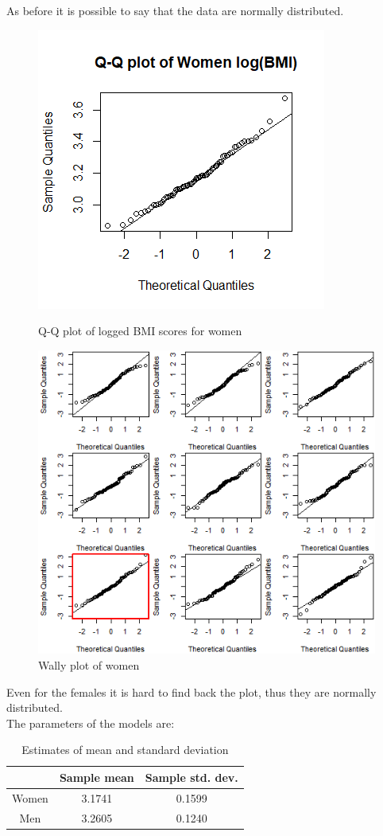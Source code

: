 As before it is possible to say that the data are normally distributed. \\
\begin{figure}[h!]
    \centering
    \includegraphics[scale=0.9]{root/qqwomenlog.png}
    \caption{Q-Q plot of logged BMI scores for women}
    \label{womenqq}
    \includegraphics[scale=0.9]{root/wallywomen.png}
    \caption{Wally plot of women}
    \label{wallywomen}
\end{figure}
Even for the females it is hard to find back the plot, thus they are normally distributed. \\
\newpage
The parameters of the models are:
\begin{table}[h]
\centering
\begin{tabular}{|c||c|c|}
  \hline
 & \parbox{1.5cm}{\textbf{Sample mean}} & \parbox{1.5cm}{\textbf{Sample std. dev.}} \\
  \hline
  \hline
Women & 3.1741 & 0.1599   \\ 
  \hline
Men & 3.2605 & 0.1240   \\ 
  \hline
\end{tabular}
\caption{Estimates of mean and standard deviation}
\label{Table3}
\end{table}


